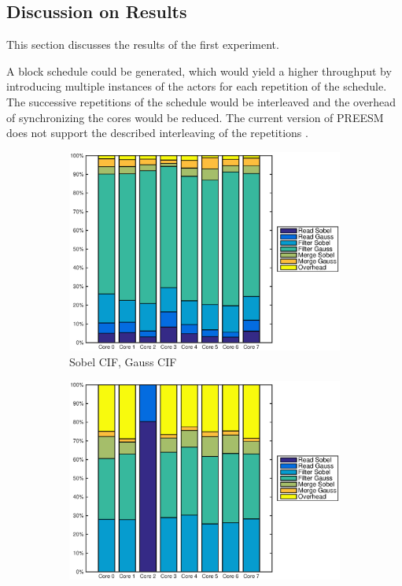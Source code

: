 \subsection{Discussion on Results}
This section discusses the results of the first experiment. 

A block schedule could be generated, which would yield a higher throughput by
introducing multiple instances of the actors for each repetition of the
schedule. The successive repetitions of the schedule would be interleaved and
the overhead of synchronizing the cores would be reduced. The current version of
PREESM does not support the described interleaving of the repetitions
\cite{pelcat2014preesm}.

\begin{figure}
    \centering
    \begin{subfigure}[t]{0.49\textwidth}
        \centering
        \includegraphics[width=0.99\linewidth]{images/openem_cifcif_8cores_eo.eps}
        \caption{Sobel CIF, Gauss CIF}
        \label{fig:oem8coreeo}
    \end{subfigure}
    \begin{subfigure}[t]{0.49\textwidth}
        \centering
        \includegraphics[width=0.99\linewidth]{images/openem_sobel4cif_gausscif_eo.eps}

\end{subfigure}
\end{figure}
